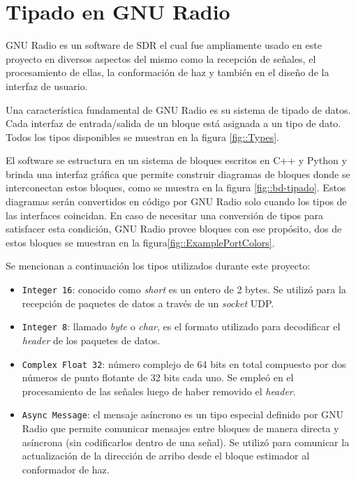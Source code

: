 \documentclass[../../main.tex]{subfiles}
\begin{document}
\graphicspath{{./figures}}
\chapter{Tipado en GNU Radio}\label{ap::tipado-gnu}

GNU Radio es un software de SDR el cual fue ampliamente usado en este proyecto en diversos aspectos del mismo como la recepción de señales, el procesamiento de ellas, la conformación de haz y también en el diseño de la interfaz de usuario.

Una característica fundamental de GNU Radio es su sistema de tipado de datos. Cada interfaz de entrada/salida de un bloque está asignada a un tipo de dato. Todos los tipos disponibles se muestran en la figura \ref{fig::Types}.

El software se estructura en un sistema de bloques escritos en C++ y Python y brinda una interfaz gráfica que permite construir diagramas de bloques donde se interconectan estos bloques, como se muestra en la figura \ref{fig::bd-tipado}. Estos diagramas serán convertidos en código por GNU Radio solo cuando los tipos de las interfaces coincidan. En caso de necesitar una conversión de tipos para satisfacer esta condición, GNU Radio provee bloques con ese propósito, dos de estos bloques se muestran en la figura\ref{fig::ExamplePortColors}.

Se mencionan a continuación los tipos utilizados durante este proyecto:
\begin{itemize}
    \item \texttt{Integer 16}: conocido como \textit{short} es un entero de 2 bytes. Se utilizó para la recepción de paquetes de datos a través de un \textit{socket} UDP.
    \item \texttt{Integer 8}: llamado \textit{byte} o \textit{char}, es el formato utilizado para decodificar el \textit{header} de los paquetes de datos.
    \item \texttt{Complex Float 32}: número complejo de 64 bits en total compuesto por dos números de punto flotante de 32 bits cada uno. Se empleó en el procesamiento de las señales luego de haber removido el \textit{header}.
    \item \texttt{Async Message}: el mensaje asíncrono es un tipo especial definido por GNU Radio que permite comunicar mensajes entre bloques de manera directa y asíncrona (sin codificarlos dentro de una señal). Se utilizó para comunicar la actualización de la dirección de arribo desde el bloque estimador al conformador de haz.
\end{itemize}

\end{document}
